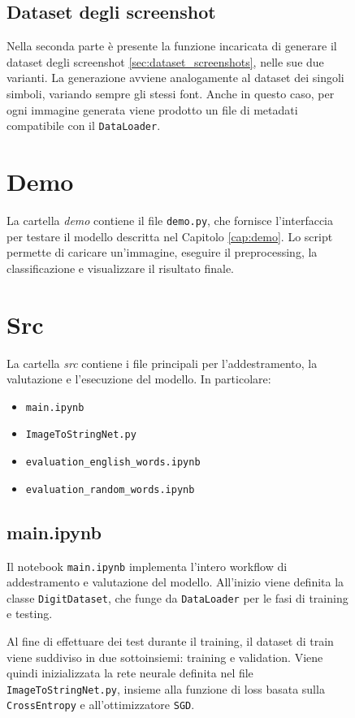 \begin{figure}[H]
\subsection*{Dataset degli screenshot}
Nella seconda parte è presente la funzione incaricata di generare il dataset degli screenshot \ref{sec:dataset_screenshots}, nelle sue due varianti. La generazione avviene analogamente al dataset dei singoli simboli, variando sempre gli stessi font.
Anche in questo caso, per ogni immagine generata viene prodotto un file di metadati compatibile con il \texttt{DataLoader}.

\section{Demo}
La cartella \emph{demo} contiene il file \texttt{demo.py}, che fornisce l'interfaccia per testare il modello descritta nel Capitolo \ref{cap:demo}. Lo script permette di caricare un'immagine, eseguire il preprocessing, la classificazione e visualizzare il risultato finale.

\section{Src}
La cartella \emph{src} contiene i file principali per l'addestramento, la valutazione e l'esecuzione del modello. In particolare:
\begin{itemize}
    \item \texttt{main.ipynb}
    \item \texttt{ImageToStringNet.py}
    \item \texttt{evaluation\_english\_words.ipynb}
    \item \texttt{evaluation\_random\_words.ipynb}
\end{itemize}

\subsection*{main.ipynb}
Il notebook \texttt{main.ipynb} implementa l'intero workflow di addestramento e valutazione del modello.
All'inizio viene definita la classe \texttt{DigitDataset}, che funge da \texttt{DataLoader} per le fasi di training e testing.

Al fine di effettuare dei test durante il training, il dataset di train viene suddiviso in due sottoinsiemi: training e validation.
Viene quindi inizializzata la rete neurale definita nel file \texttt{ImageToStringNet.py}, insieme alla funzione di loss basata sulla \texttt{CrossEntropy} e all'ottimizzatore \texttt{SGD}.


\end{figure}
